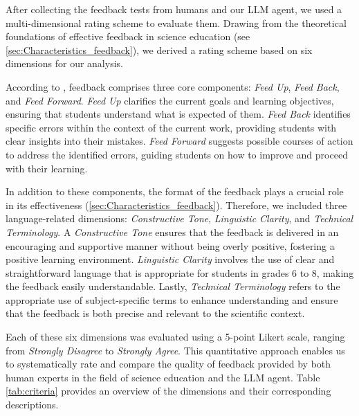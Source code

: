 After collecting the feedback tests from humans and our LLM agent, we used a multi-dimensional rating scheme to evaluate them.
Drawing from the theoretical foundations of effective feedback in science education (see \ref{sec:Characteristics_feedback}), we derived a rating scheme based on six dimensions for our analysis. 

According to \citet{hattie2007power}, feedback comprises three core components: \textit{Feed Up}, \textit{Feed Back}, and \textit{Feed Forward}. \textit{Feed Up} clarifies the current goals and learning objectives, ensuring that students understand what is expected of them. \textit{Feed Back} identifies specific errors within the context of the current work, providing students with clear insights into their mistakes. \textit{Feed Forward} suggests possible courses of action to address the identified errors, guiding students on how to improve and proceed with their learning.

In addition to these components, the format of the feedback plays a crucial role in its effectiveness (\ref{sec:Characteristics_feedback}). Therefore, we included three language-related dimensions: \textit{Constructive Tone}, \textit{Linguistic Clarity}, and \textit{Technical Terminology}. A \textit{Constructive Tone} ensures that the feedback is delivered in an encouraging and supportive manner without being overly positive, fostering a positive learning environment. \textit{Linguistic Clarity} involves the use of clear and straightforward language that is appropriate for students in grades 6 to 8, making the feedback easily understandable. Lastly, \textit{Technical Terminology} refers to the appropriate use of subject-specific terms to enhance understanding and ensure that the feedback is both precise and relevant to the scientific context.

Each of these six dimensions was evaluated using a 5-point Likert scale, ranging from \textit{Strongly Disagree} to \textit{Strongly Agree}. This quantitative approach enables us to systematically rate and compare the quality of feedback provided by both human experts in the field of science education and the LLM agent. Table \ref{tab:criteria} provides an overview of the dimensions and their corresponding descriptions.

